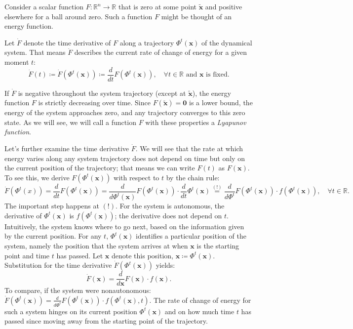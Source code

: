 \documentclass[hidelinks,a4paper, 11pt]{article}
\theoremstyle{plain}
\theoremstyle{break}
\theoremstyle{plain}
\theoremstyle{definition}
\begin{document}
Consider a scalar function $F: \mathbb R^n \to \mathbb R$ that is zero at some point $\mathbf{\tilde x}$ and positive elsewhere for a ball around zero. Such a function $F$ might be thought of an energy function. 

Let $\dot F$ denote the time derivative of $F$ along a trajectory $\Phi^t(\mathbf x)$ of the dynamical system. That means $\dot F$ describes the current rate of change of energy for a given moment $t$:
\[
	\dot F(t) \coloneqq \dot F(\Phi^t(\mathbf x)) \coloneqq \frac{d}{dt} F(\Phi^t(\mathbf x)), \quad \text{$\forall t \in \mathbb R$ and $\mathbf x$ is fixed}.
\]

If $\dot F$ is negative throughout the system trajectory (except at $\mathbf{\tilde x}$),  the energy function $F$ is strictly decreasing over time. Since $F(\mathbf{\tilde x}) = \mathbf 0$ is a lower bound, the energy of the system approaches zero, and any trajectory converges to this zero state. As we will see, we will call a function $F$ with these properties a \emph{Lyapunov function}. 

Let's further examine the time derivative $\dot F$. We will see that the rate at which energy varies along any system trajectory does not depend on time but only on the current position of the trajectory; that means we can write $F(t)$ as $F(\mathbf x)$. To see this, we derive $F(\Phi^t(\mathbf x))$ with respect to $t$ by the chain rule:
\[
	\dot F(\Phi^t(x)) = \frac{d}{dt}F(\Phi^t(\mathbf x)) = \frac{d}{d\Phi^t(\mathbf x)}F(\Phi^t(\mathbf x))  \cdot \frac{d}{dt}\Phi^t(\mathbf x) \overset{(!)}{=} \frac{d}{d\Phi^t}F(\Phi^t(\mathbf x)) \cdot f(\Phi^t(\mathbf x)), \quad \forall t \in \mathbb R.
\] 
The important step happens at $(!)$. For the system is autonomous, the derivative of $\Phi^t(\mathbf x)$ is $f(\Phi^t(\mathbf x))$; the derivative does not depend on $t$. Intuitively, the system knows where to go next, based on the information given by the current position. For any $t$, $\Phi^t(\mathbf x)$ identifies a particular position of the system, namely the position that the system arrives at when $\mathbf x$ is the starting point and time $t$ has passed. Let $\mathbf x$ denote this position, $\mathbf x \coloneqq \Phi^t(\mathbf x)$. Substitution for the time derivative $\dot F(\Phi^t(\mathbf x))$ yields:
\[
	\dot F(\mathbf x) = \frac{d}{d\mathbf x}F(\mathbf x) \cdot f(\mathbf x).
\]
To compare, if the system were nonautonomous: $\dot F(\Phi^t(\mathbf x)) =  \frac{d}{d\Phi^t}F(\Phi^t(\mathbf x)) \cdot f(\Phi^t(\mathbf x), t)$. The rate of change of energy for such a system hinges on its current position $\Phi^t(\mathbf x)$ and on how much time $t$ has passed since moving away from the starting point of the trajectory.
\end{document}
